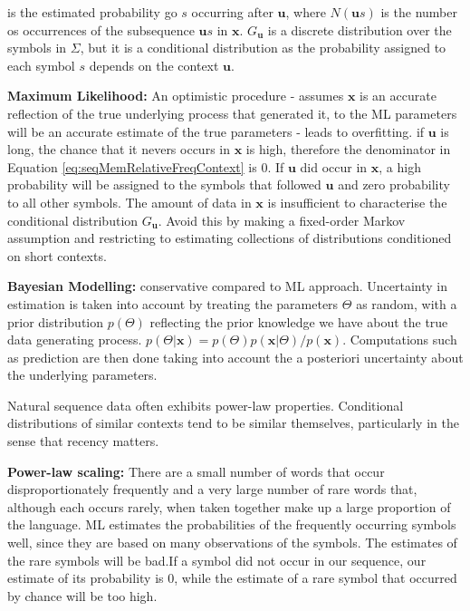 \noindent is the estimated probability go $s$ occurring after $\boldsymbol{u}$, where $N(\boldsymbol{u}s)$ is the number os occurrences of the subsequence $\boldsymbol{u}s$ in $\boldsymbol{x}$. $G_{\boldsymbol{u}}$ is a discrete distribution over the symbols in $\Sigma$, but it is a conditional distribution as the probability assigned to each symbol $s$ depends on the context $\boldsymbol{u}$.

\textbf{Maximum Likelihood:} An optimistic procedure - assumes $\boldsymbol{x}$ is an accurate reflection of the true underlying process that generated it, to the ML parameters will be an accurate estimate of the true parameters - leads to overfitting. if $\boldsymbol{u}$ is long, the chance that it nevers occurs in $\boldsymbol{x}$ is high, therefore the denominator in Equation \ref{eq:seqMemRelativeFreqContext} is 0. If $\boldsymbol{u}$ did occur in $\boldsymbol{x}$, a high probability will be assigned to the symbols that followed $\boldsymbol{u}$ and zero probability to all other symbols. The amount of data in $\boldsymbol{x}$ is insufficient to characterise the conditional distribution $G_{\boldsymbol{u}}$. Avoid this by making a fixed-order Markov assumption and restricting to estimating collections of distributions conditioned on short contexts.

\textbf{Bayesian Modelling:} conservative compared to ML approach. Uncertainty in estimation is taken into account by treating the parameters $\Theta$ as random, with a prior distribution $p(\Theta)$ reflecting the prior knowledge we have about the true data generating process. $p(\Theta | \boldsymbol{x})=p(\Theta)p(\boldsymbol{x}|\Theta)/p(\boldsymbol{x})$. Computations such as prediction are then done taking into account the a posteriori uncertainty about the underlying parameters.

Natural sequence data often exhibits power-law properties. Conditional distributions of similar contexts tend to be similar themselves, particularly in the sense that recency matters.

\textbf{Power-law scaling:} There are a small number of words that occur disproportionately frequently and a very large number of rare words that, although each occurs rarely, when taken together make up a large proportion of the language. ML estimates the probabilities of the frequently occurring symbols well, since they are based on many observations of the symbols. The estimates of the rare symbols will be bad.If a symbol did not occur in our sequence, our estimate of its probability is 0, while the estimate of a rare symbol that occurred by chance will be too high.

